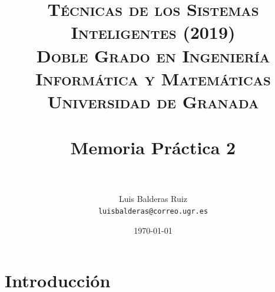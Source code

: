 
\graphicspath{ {./images/} }
\usepackage{subcaption}
\usepackage{hyperref}
\usepackage{soul}



\title{	
\normalfont \normalsize 
\textsc{\textbf{Técnicas de los Sistemas Inteligentes (2019)} \\ Doble Grado en Ingeniería Informática y Matemáticas \\ Universidad de Granada} \\ [25pt] %
\horrule{0.5pt} \\[0.4cm] %
\huge Memoria Práctica 2 \\ %
\horrule{2pt} \\[0.5cm] %
}

\author{Luis Balderas Ruiz \\ \texttt{luisbalderas@correo.ugr.es}} 


\date{\normalsize\today} %




\maketitle %

\newpage %

\tableofcontents %

\listoffigures

\newpage

\section{Introducción}


